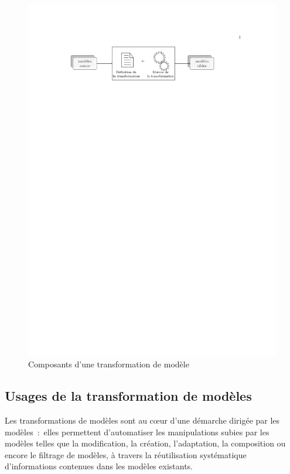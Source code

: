 \begin{figure}[!ht]
    \centering
    \includegraphics[trim=100 655 145 100, clip]{figures/3_etat_de_l_art_IDM/composants_transfo.pdf} %
    \caption{Composants d'une transformation de modèle}
    \label{fig:composantTransfo}
\end{figure}

\subsection{Usages de la transformation de modèles }
Les transformations de modèles sont au cœur d'une démarche dirigée par les 
modèles~:~elles permettent d'automatiser les manipulations subies par les 
modèles telles que la modification, la création, l'adaptation, la composition ou 
encore le filtrage de modèles, à travers la réutilisation systématique 
d'informations contenues dans les modèles existants. 


